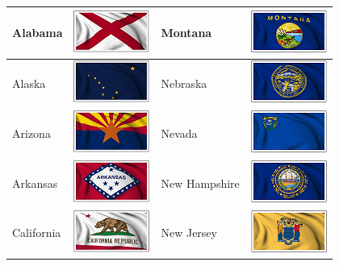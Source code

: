 \documentclass{ximera}
\begin{document}
\begin{center}

\begin{tabular}{|l|l|l|l|}
\hline
Alabama & \includegraphics{pics/StateFlags/Alabama.png} & Montana & \includegraphics{pics/StateFlags/Montana.png} \\\hline 
Alaska & \includegraphics{pics/StateFlags/Alaska.png} & Nebraska & \includegraphics{pics/StateFlags/Nebraska.png} \\\hline 
Arizona & \includegraphics{pics/StateFlags/Arizona.png} & Nevada & \includegraphics{pics/StateFlags/Nevada.png} \\\hline 
Arkansas & \includegraphics{pics/StateFlags/Arkansas.png} & New Hampshire & \includegraphics{pics/StateFlags/NewHampshire.png} \\\hline 
California & \includegraphics{pics/StateFlags/California.png} & New Jersey & \includegraphics{pics/StateFlags/NewJersey.png} \\\hline 

\end{tabular}
\end{center}
\end{document}
